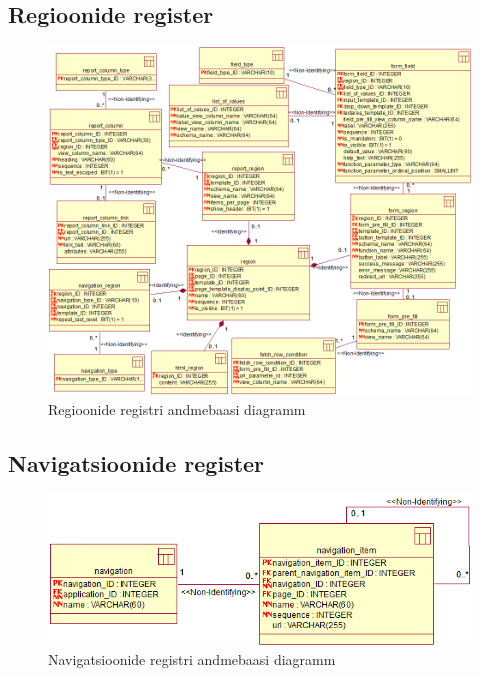 \documentclass[a4paper,12pt]{article} %
\begin{document}
\subsection*{Regioonide register}
\begin{figure}[H]
\centering
\includegraphics[width=\textwidth]{./diagrams/region-db-diagram.png}
\caption{Regioonide registri andmebaasi diagramm}
\label{fig_regioonide_registri_andmebaasi_diagramm}
\end{figure}

\subsection*{Navigatsioonide register}
\begin{figure}[H]
\centering
\includegraphics[width=\textwidth]{./diagrams/navigation-db-diagram.png}
\caption{Navigatsioonide registri andmebaasi diagramm}
\label{fig_navigatsioonide_registri_andmebaasi_diagramm}
\end{figure}
\end{document}
